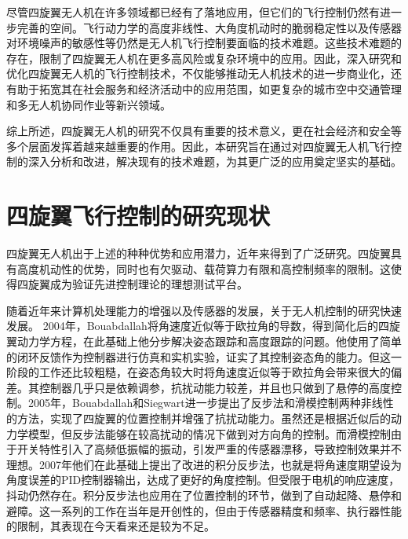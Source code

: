 尽管四旋翼无人机在许多领域都已经有了落地应用，但它们的飞行控制仍然有进一步完善的空间。飞行动力学的高度非线性、大角度机动时的脆弱稳定性以及传感器对环境噪声的敏感性等仍然是无人机飞行控制要面临的技术难题。这些技术难题的存在，限制了四旋翼无人机在更多高风险或复杂环境中的应用。因此，深入研究和优化四旋翼无人机的飞行控制技术，不仅能够推动无人机技术的进一步商业化，还有助于拓宽其在社会服务和经济活动中的应用范围，如更复杂的城市空中交通管理和多无人机协同作业等新兴领域。

综上所述，四旋翼无人机的研究不仅具有重要的技术意义，更在社会经济和安全等多个层面发挥着越来越重要的作用。因此，本研究旨在通过对四旋翼无人机飞行控制的深入分析和改进，解决现有的技术难题，为其更广泛的应用奠定坚实的基础。

\section{四旋翼飞行控制的研究现状}
四旋翼无人机出于上述的种种优势和应用潜力，近年来得到了广泛研究\cite{survey}。四旋翼具有高度机动性的优势，同时也有欠驱动、载荷算力有限和高控制频率的限制。这使得四旋翼成为验证先进控制理论的理想测试平台\cite{La2018}。
   

随着近年来计算机处理能力的增强以及传感器的发展，关于无人机控制的研究快速发展。
2004年，Bouabdallah将角速度近似等于欧拉角的导数，得到简化后的四旋翼动力学方程，在此基础上他分步解决姿态跟踪和高度跟踪的问题。他使用了简单的闭环反馈作为控制器进行仿真和实机实验，证实了其控制姿态角的能力\cite{boua2007}。但这一阶段的工作还比较粗糙，在姿态角较大时将角速度近似等于欧拉角会带来很大的偏差。其控制器几乎只是依赖调参，抗扰动能力较差，并且也只做到了悬停的高度控制。2005年，Bouabdallah和Siegwart进一步提出了反步法和滑模控制两种非线性的方法\cite{boua2005}，实现了四旋翼的位置控制并增强了抗扰动能力。虽然还是根据近似后的动力学模型，但反步法能够在较高扰动的情况下做到对方向角的控制。而滑模控制由于开关特性引入了高频低振幅的振动，引发严重的传感器漂移，导致控制效果并不理想。2007年他们在此基础上提出了改进的积分反步法\cite{bouabdallah2007full}，也就是将角速度期望设为角度误差的PID控制器输出，达成了更好的角度控制。但受限于电机的响应速度，抖动仍然存在。积分反步法也应用在了位置控制的环节，做到了自动起降、悬停和避障。这一系列的工作在当年是开创性的，但由于传感器精度和频率、执行器性能的限制，其表现在今天看来还是较为不足。

